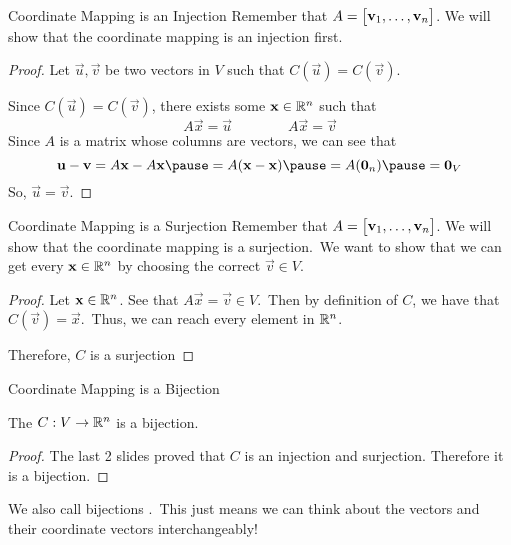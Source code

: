 \documentclass[xcoler=dvipsnames, aspectratio=169]{beamer}
\begin{document}
    \begin{frame}{Coordinate Mapping is an Injection}
        Remember that $A = \begin{bmatrix}\mathbf{v}_1,\dots,\mathbf{v}_n\end{bmatrix}$. We will show that the coordinate mapping
        is an injection first.\pause
        \begin{proof}
            Let $\vec{u},\vec{v}$ be two vectors in $V$ such that $C(\vec{u}) = C(\vec{v})$.\pause
            
            Since $C(\vec{u}) = C(\vec{v})$, there exists some $\mathbf{x}\in\mathbb{R}^n$ such that
            \[
                A\vec{x} = \vec{u}\qquad\qquad A\vec{x}=\vec{v}
            \]\pause
            Since $A$ is a matrix whose columns are vectors, we can see that
            \[
                \vec{u}-\vec{v} = A\vec{x} - A\vec{x}\pause = A(\vec{x}-\vec{x})\pause = 
                A(\vec{0}_n)\pause = \vec{0}_V
            \]\pause
            So, $\vec{u}=\vec{v}$.
        \end{proof}
    \end{frame}
    \begin{frame}{Coordinate Mapping is a Surjection}
        Remember that $A = \begin{bmatrix}\mathbf{v}_1,\dots,\mathbf{v}_n\end{bmatrix}$. We will show that the coordinate mapping
        is a surjection.\pause\ 
        We want to show that we can get every $\mathbf{x}\in\mathbb{R}^n$ by choosing the correct $\vec{v}\in V$.\pause
        \begin{proof}
            Let $\mathbf{x}\in\mathbb{R}^n$. See that $A\vec{x} = \vec{v}\in V$.\pause\ 
            Then by definition of $C$, we have that $C(\vec{v}) = \vec{x}$.\pause\ Thus, we can reach every element in $\mathbb{R}^n$.\pause

            Therefore, $C$ is a surjection
        \end{proof}
    \end{frame}
    \begin{frame}{Coordinate Mapping is a Bijection}
        \begin{theorem}
            The \bText{coordinate mapping} $C:V\rightarrow\mathbb{R}^n$ is a bijection.
        \end{theorem}\pause
        \begin{proof}
            The last 2 slides proved that $C$ is an injection and surjection. Therefore it is a 
            bijection.
        \end{proof}\pause
        \vspace{60pt}
        \begin{tcolorbox}
            We also call bijections .\pause\ This just means we can think about
            the vectors and their coordinate vectors interchangeably!
        \end{tcolorbox}
    \end{frame}
\end{document}
